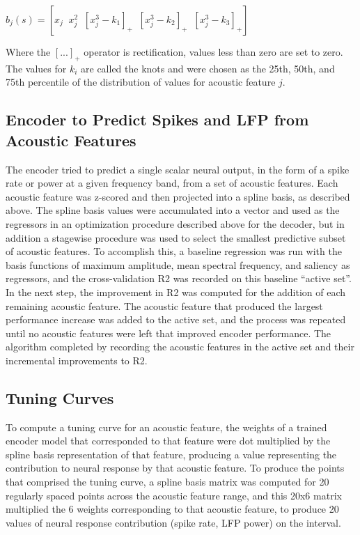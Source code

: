 \begin{center}
$b_j (s) = [x_j \;\; x_j^2 \;\; [x_j^3 - k_1]_+ \;\; [x_j^3 - k_2]_+ \;\; [x_j^3 - k_3]_+ ]$
\end{center}

Where the $[...]_+$ operator is rectification, values less than zero are set to zero. The values for $k_i$ are called the knots and were chosen as the 25th, 50th, and 75th percentile of the distribution of values for acoustic feature $j$.


\subsection{Encoder to Predict Spikes and LFP from Acoustic Features}

The encoder tried to predict a single scalar neural output, in the form of a spike rate or power at a given frequency band, from a set of acoustic features. Each acoustic feature was z-scored and then projected into a spline basis, as described above. The spline basis values were accumulated into a vector and used as the regressors in an optimization procedure described above for the decoder, but in addition a stagewise procedure was used to select the smallest predictive subset of acoustic features. To accomplish this, a baseline regression was run with the basis functions of maximum amplitude, mean spectral frequency, and saliency as regressors, and the cross-validation R2 was recorded on this baseline ``active set''. In the next step, the improvement in R2 was computed for the addition of each remaining acoustic feature. The acoustic feature that produced the largest performance increase was added to the active set, and the process was repeated until no acoustic features were left that improved encoder performance. The algorithm completed by recording the acoustic features in the active set and their incremental improvements to R2.


\subsection{Tuning Curves}

To compute a tuning curve for an acoustic feature, the weights of a trained encoder model that corresponded to that feature were dot multiplied by the spline basis representation of that feature, producing a value representing the contribution to neural response by that acoustic feature. To produce the points that comprised the tuning curve, a spline basis matrix was computed for 20 regularly spaced points across the acoustic feature range, and this 20x6 matrix multiplied the 6 weights corresponding to that acoustic feature, to produce 20 values of neural response contribution (spike rate, LFP power) on the interval.


